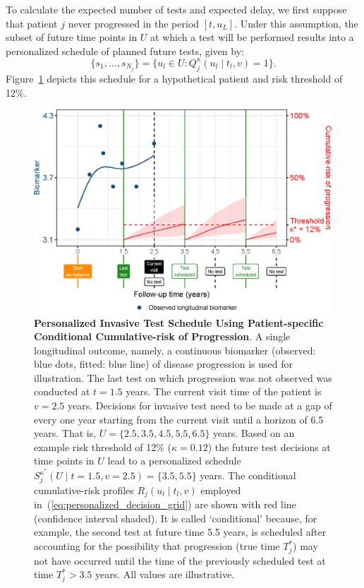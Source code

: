 To calculate the expected number of tests and expected delay, we first suppose that patient $j$ never progressed in the period $[t, u_L]$. Under this assumption, the subset of future time points in $U$ at which a test will be performed results into a personalized schedule of planned future tests, given by:
\begin{equation}
\label{eq:personalized_schedule_grid}
\{s_1, \ldots, s_{N_j}\} = \big\{ u_l \in U : Q_j^\kappa(u_l \mid t_l, v) = 1 \big\}.
\end{equation}
Figure~\ref{fig:schedule_explanation} depicts this schedule for a hypothetical patient and risk threshold of 12\%.
\begin{figure}
\centerline{\includegraphics{images/schedule_explanation_102.eps}}
\caption{\textbf{Personalized Invasive Test Schedule Using Patient-specific Conditional Cumulative-risk of Progression}.  A single longitudinal outcome, namely, a continuous biomarker (observed: blue dots, fitted: blue line) of disease progression is used for illustration. The last test on which progression was not observed was conducted at $t=1.5$ years. The current visit time of the patient is $v=2.5$ years. Decisions for invasive test need to be made at a gap of every one year starting from the current visit until a horizon of 6.5 years. That is, $U=\{2.5, 3.5, 4.5, 5.5, 6.5\}$ years. Based on an example risk threshold of 12\% ($\kappa=0.12$) the future test decisions at time points in $U$ lead to a personalized schedule $S_j^{\kappa^*} (U \mid t=1.5, v=2.5) = \{3.5, 5.5\}$ years. The conditional cumulative-risk profiles $R_j(u_l \mid t_l, v)$ employed in~(\ref{eq:personalized_decision_grid}) are shown with red line (confidence interval shaded). It is called `conditional' because, for example, the second test at future time 5.5 years, is scheduled after accounting for the possibility that progression (true time $T^*_j$) may not have occurred until the time of the previously scheduled test at time $T^*_j>3.5$ years. All values are illustrative.} 
\label{fig:schedule_explanation}
\end{figure}
